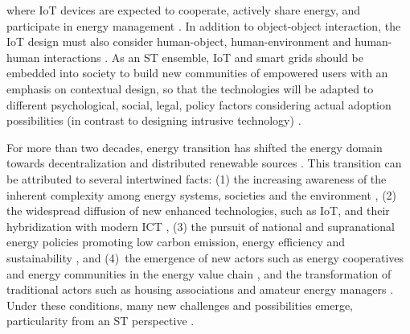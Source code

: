 %
% 
where IoT devices are expected to cooperate, actively share energy, and participate in energy management \cite{karnouskos2010cooperative,Padget2010}. 
% 
In addition to object-object interaction, the IoT design must also consider human-object, human-environment and human-human interactions \cite{guo2012opportunistic,guo2013opportunistic}. %
As an ST ensemble, IoT and smart grids should be embedded into society to build new communities of empowered users with an emphasis on contextual design, so that the technologies will be adapted to different psychological, social, legal, policy factors considering actual adoption possibilities (in contrast to designing intrusive technology)  \cite{ning2011future,Shin2014}.

For more than two decades, energy transition has shifted the energy domain
towards decentralization and distributed renewable sources \cite{rifkin_third_2011,sovacool_how_2016}. This transition can be attributed to several intertwined facts: 
(1) the increasing awareness of the inherent complexity among energy systems, societies 
and the environment \cite{bulkeley_bringing_2012,umbach_global_2010}, (2) the
widespread diffusion of new enhanced technologies, such as IoT, and their hybridization with modern ICT
\cite{putrus_smart_2013,schick_innovating_2013}, (3) the pursuit of national and 
supranational energy policies promoting low carbon emission, energy efficiency and sustainability
\cite{da_graca_carvalho_eu_2012}, and (4)~the emergence of new actors such as energy cooperatives and energy communities in the energy value chain \cite{viardot_role_2013}, and the 
transformation of traditional actors such as housing associations and amateur energy managers 
\cite{Hasselqvist2016}.
Under these conditions, many new challenges and possibilities emerge, particularity from an ST perspective  \cite{Shin2014}. 

